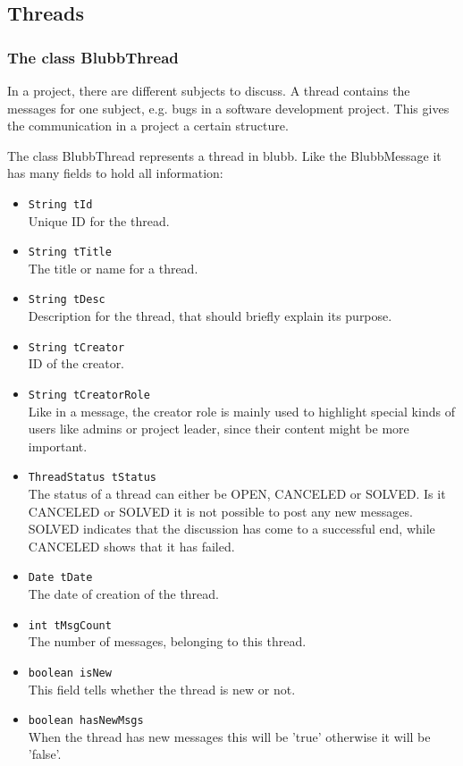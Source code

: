 \documentclass[12pt,a4paper,oneside]{report}
\newcommand{\appname}{blubb}
\newcommand{\code}[1]{\lstinline{#1}}
\begin{document}
\subsection{Threads}
\subsubsection{The class BlubbThread}
In a project, there are different subjects to discuss. A thread contains the messages for one subject, e.g. bugs in a software development project. This gives the communication in a project a certain structure. 

The class BlubbThread represents a thread in \appname{}. Like the BlubbMessage it has many fields to hold all information:
\begin{itemize}
\item \code{String tId}\\
Unique ID for the thread.
\item \code{String tTitle}\\
The title or name for a thread.
\item \code{String tDesc}\\
Description for the thread, that should briefly explain its purpose.
\item \code{String tCreator}\\
ID of the creator.
\item \code{String tCreatorRole}\\
Like in a message, the creator role is mainly used to highlight special kinds of users like admins or project leader, since their content might be more important.
\item \code{ThreadStatus tStatus}\\
The status of a thread can either be OPEN, CANCELED or SOLVED. Is it CANCELED or SOLVED it is not possible to post any new messages. SOLVED indicates that the discussion has come to a successful end, while CANCELED shows that it has failed.
\item \code{Date tDate}\\
The date of creation of the thread.
\item \code{int tMsgCount}\\
The number of messages, belonging to this thread.
\item \code{boolean isNew}\\
This field tells whether the thread is new or not.
\item \code{boolean hasNewMsgs}\\
When the thread has new messages this will be 'true' otherwise it will be 'false'.

\end{itemize}
\end{document}
